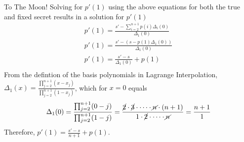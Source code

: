 \begin{homeworkProblem}{To The Moon!}
    Solving for $p'(1)$ using the above equations for both the true and fixed secret
    results in a solution for $p'(1)$
    \[
        \begin{split}
            p'(1) = \frac{s' - \sum_{i=2}^{n+1} p(i)\Delta_i(0)}{\Delta_1(0)} \\
            p'(1) = \frac{s' - (s - p(1)\Delta_1(0))}{\Delta_1(0)} \\
            p'(1) = \frac{s' - s}{\Delta_1(0)} + p(1) \\
        \end{split}    
    \]
    From the defintion of the basis polynomials in Lagrange Interpolation,
    $\Delta_1(x) = \frac{\prod_{j=2}^{n+1} (x-x_j)}{\prod_{j=2}^{n+1} (1- x_j)}$,
    which for $x=0$ equals
    \[
        \Delta_1(0) = \frac{\prod_{j=2}^{n+1} (0-j)}{\prod_{j=2}^{n+1} (1 - j)} =
        \frac{\cancel{2} \cdot \cancel{3} \cdot \dots \cdot \cancel{n} \cdot (n+1)}
        {1 \cdot \cancel{2} \cdot \dots \cdot \cancel{n}} = 
        \frac{n+1}{1}
    \]
    Therefore, $p'(1) = \frac{s'-s}{n+1} + p(1)$.
    


    
    
    


\end{homeworkProblem}

